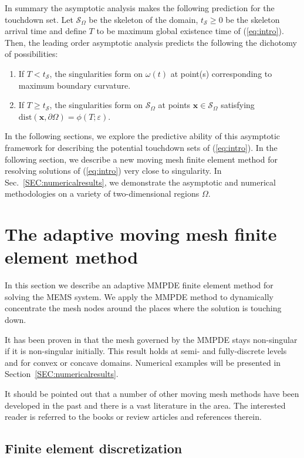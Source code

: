 \documentclass{siamart0516}
\renewcommand{\eqref}[1]{(\ref{#1})}
\newcommand{\eps}{\varepsilon}
\newcommand{\bx}{\mathbf{x}}
\newcommand{\skel}{\mathcal{S}_{\Omega}}
\newcommand{\sat}{t_{\mathcal{S}}}
\theoremstyle{plain}%
\theoremstyle{definition}
\theoremstyle{remark}
\begin{document}
In summary the asymptotic analysis makes the following prediction for the touchdown set. Let $\skel$ be the skeleton of the domain, $\sat\geq0$ be the skeleton arrival time and define $T$ to be maximum global existence time of \eqref{eq:intro}. Then, the leading order asymptotic analysis predicts the following the dichotomy of possibilities:
\begin{enumerate}
\item If $T <\sat$, the singularities form on $\omega(t)$ at point(s) corresponding to maximum boundary curvature.
\item If $T \geq \sat$, the singularities form on $\skel$ at points $\bx\in\skel$ satisfying $\mbox{dist}(\bx,\partial\Omega) = \phi(T;\eps)$.
\end{enumerate}
In the following sections, we explore the predictive ability of this asymptotic framework for describing the potential touchdown sets of \eqref{eq:intro}. In the following section, we describe a new moving mesh finite element method for resolving solutions of \eqref{eq:intro} very close to singularity. In Sec.~\ref{SEC:numericalresults}, we demonstrate the asymptotic and numerical methodologies on a variety of two-dimensional regions $\Omega$.

\section{The adaptive moving mesh finite element method}\label{SEC:fem}

In this section we describe an adaptive MMPDE finite element method for solving
the MEMS system. We apply the MMPDE method to dynamically concentrate the mesh nodes
around the places where the solution is touching down.

It has been proven in \cite{HK2015} that the mesh governed by the MMPDE
stays non-singular if it is non-singular initially. This result holds at semi- and fully-discrete levels and
for convex or concave domains. Numerical examples will be presented in Section~\ref{SEC:numericalresults}.

It should be pointed out that a number of other moving mesh methods have been developed in the past
and there is a vast literature in the area. The interested reader is referred to the books or review articles \cite{Bai94a,Baines-2011,BHR09,HR11,Tan05} and references therein.

\subsection{Finite element discretization}
\end{document}
